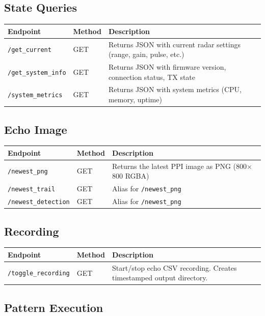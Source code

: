 \documentclass[11pt,letterpaper]{article}
\begin{document}
\subsection{State Queries}

\begin{longtable}{@{}llp{7cm}@{}}
\toprule
\textbf{Endpoint} & \textbf{Method} & \textbf{Description} \\
\midrule
\endhead
\texttt{/get\_current} & GET & Returns JSON with current radar settings (range, gain, pulse, etc.) \\
\texttt{/get\_system\_info} & GET & Returns JSON with firmware version, connection status, TX state \\
\texttt{/system\_metrics} & GET & Returns JSON with system metrics (CPU, memory, uptime) \\
\bottomrule
\end{longtable}

\subsection{Echo Image}

\begin{longtable}{@{}llp{7cm}@{}}
\toprule
\textbf{Endpoint} & \textbf{Method} & \textbf{Description} \\
\midrule
\endhead
\texttt{/newest\_png} & GET & Returns the latest PPI image as PNG (800$\times$800 RGBA) \\
\texttt{/newest\_trail} & GET & Alias for \texttt{/newest\_png} \\
\texttt{/newest\_detection} & GET & Alias for \texttt{/newest\_png} \\
\bottomrule
\end{longtable}

\subsection{Recording}

\begin{longtable}{@{}llp{7cm}@{}}
\toprule
\textbf{Endpoint} & \textbf{Method} & \textbf{Description} \\
\midrule
\endhead
\texttt{/toggle\_recording} & GET & Start/stop echo CSV recording. Creates timestamped output directory. \\
\bottomrule
\end{longtable}

\subsection{Pattern Execution}
\end{document}
